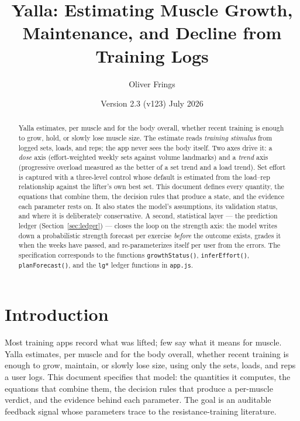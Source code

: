 \documentclass[11pt,a4paper]{article}
\title{Yalla: Estimating Muscle Growth, Maintenance, and Decline from Training Logs}
\author{Oliver Frings}
\date{Version 2.3 (v123) \quad 19 July 2026}
\begin{document}
\maketitle

\begin{abstract}
\noindent Yalla estimates, per muscle and for the body overall, whether recent training is enough to grow, hold, or slowly lose muscle size. The estimate reads \emph{training stimulus} from logged sets, loads, and reps; the app never sees the body itself. Two axes drive it: a \emph{dose} axis (effort-weighted weekly sets against volume landmarks) and a \emph{trend} axis (progressive overload measured as the better of a set trend and a load trend). Set effort is captured with a three-level control whose default is estimated from the load--rep relationship against the lifter's own best set. This document defines every quantity, the equations that combine them, the decision rules that produce a state, and the evidence each parameter rests on. It also states the model's assumptions, its validation status, and where it is deliberately conservative. A second, statistical layer --- the prediction ledger (Section~\ref{sec:ledger}) --- closes the loop on the strength axis: the model writes down a probabilistic strength forecast per exercise \emph{before} the outcome exists, grades it when the weeks have passed, and re-parameterizes itself per user from the errors. The specification corresponds to the functions \texttt{growthStatus()}, \texttt{inferEffort()}, \texttt{planForecast()}, and the \texttt{lg*} ledger functions in \texttt{app.js}.
\end{abstract}

\section{Introduction}
Most training apps record what was lifted; few say what it means for muscle. Yalla estimates, per muscle and for the body overall, whether recent training is enough to grow, maintain, or slowly lose size, using only the sets, loads, and reps a user logs. This document specifies that model: the quantities it computes, the equations that combine them, the decision rules that produce a per-muscle verdict, and the evidence behind each parameter. The goal is an auditable feedback signal whose parameters trace to the resistance-training literature.
\end{document}
